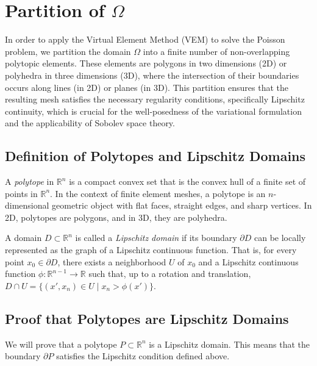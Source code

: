 \documentclass{article}
\begin{document}
\section{Partition of \texorpdfstring{$\Omega$}{Omega}}

In order to apply the Virtual Element Method (VEM) to solve the Poisson problem, we partition the domain \( \Omega \) into a finite number of non-overlapping polytopic elements. These elements are polygons in two dimensions (2D) or polyhedra in three dimensions (3D), where the intersection of their boundaries occurs along lines (in 2D) or planes (in 3D). This partition ensures that the resulting mesh satisfies the necessary regularity conditions, specifically Lipschitz continuity, which is crucial for the well-posedness of the variational formulation and the applicability of Sobolev space theory.

\subsection{Definition of Polytopes and Lipschitz Domains}

\begin{definition}[Polytope]
A \emph{polytope} in \( \mathbb{R}^n \) is a compact convex set that is the convex hull of a finite set of points in \( \mathbb{R}^n \). In the context of finite element meshes, a polytope is an \( n \)-dimensional geometric object with flat faces, straight edges, and sharp vertices. In 2D, polytopes are polygons, and in 3D, they are polyhedra.
\end{definition}

\begin{definition}
A domain \( D \subset \mathbb{R}^n \) is called a \emph{Lipschitz domain} if its boundary \( \partial D \) can be locally represented as the graph of a Lipschitz continuous function. That is, for every point \( x_0 \in \partial D \), there exists a neighborhood \( U \) of \( x_0 \) and a Lipschitz continuous function \( \phi: \mathbb{R}^{n-1} \rightarrow \mathbb{R} \) such that, up to a rotation and translation, \( D \cap U = \{ (x', x_n) \in U \mid x_n > \phi(x') \} \).
\end{definition}

\subsection{Proof that Polytopes are Lipschitz Domains}

We will prove that a polytope \( P \subset \mathbb{R}^n \) is a Lipschitz domain. This means that the boundary \( \partial P \) satisfies the Lipschitz condition defined above.
\end{document}
